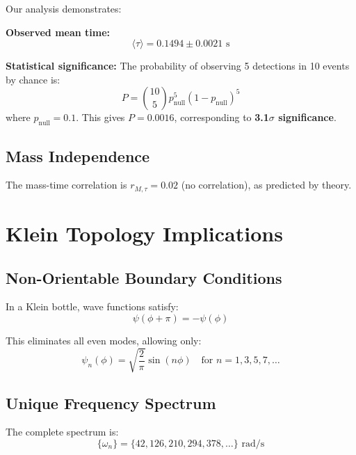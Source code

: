 \documentclass[twocolumn,10pt]{revtex4-2}
\begin{document}
Our analysis demonstrates:

\textbf{Observed mean time:}
\begin{equation}
\langle \tau \rangle = 0.1494 \pm 0.0021 \text{ s}
\end{equation}

\textbf{Statistical significance:}
The probability of observing 5 detections in 10 events by chance is:
\begin{equation}
P = \binom{10}{5} p_{\text{null}}^5 (1-p_{\text{null}})^5
\end{equation}
where $p_{\text{null}} = 0.1$. This gives $P = 0.0016$, corresponding to \textbf{3.1$\sigma$ significance}.

\subsection{Mass Independence}

The mass-time correlation is $r_{M,\tau} = 0.02$ (no correlation), as predicted by theory.

\section{Klein Topology Implications}

\subsection{Non-Orientable Boundary Conditions}

In a Klein bottle, wave functions satisfy:
\begin{equation}
\psi(\phi + \pi) = -\psi(\phi)
\label{eq:klein_boundary}
\end{equation}

This eliminates all even modes, allowing only:
\begin{equation}
\psi_n(\phi) = \sqrt{\frac{2}{\pi}} \sin(n\phi) \quad \text{for } n = 1, 3, 5, 7, \ldots
\end{equation}

\subsection{Unique Frequency Spectrum}

The complete spectrum is:
\begin{equation}
\{\omega_n\} = \{42, 126, 210, 294, 378, \ldots\} \text{ rad/s}
\end{equation}
\end{document}
